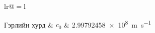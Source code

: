 \addchaptertocentry{\constantsname}

\begin{constants}{lr@{${}={}$}l}

	Гэрлийн хурд & $c_{0}$ & \SI{2.99792458e8}{\meter\per\second} \\

\end{constants}
